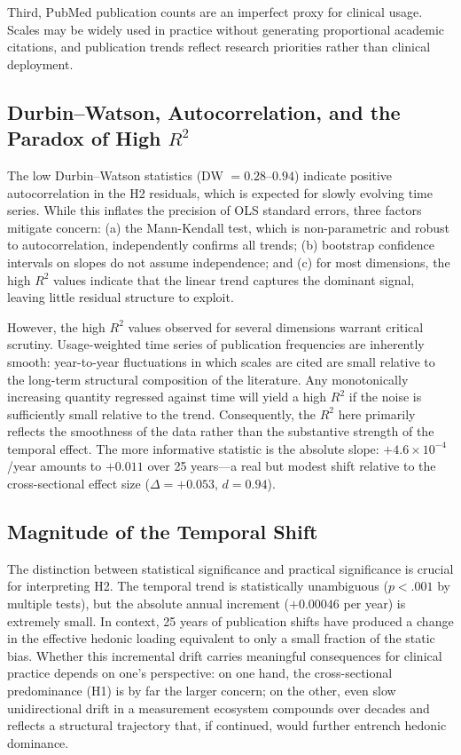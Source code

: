 \documentclass[12pt,a4paper]{article}
\begin{document}
Third, PubMed publication counts are an imperfect proxy for clinical usage.
Scales may be widely used in practice without generating proportional academic citations, and publication trends reflect research priorities rather than clinical deployment.

\subsection{Durbin--Watson, Autocorrelation, and the Paradox of High $R^2$}

The low Durbin--Watson statistics (DW $= 0.28$--$0.94$) indicate positive autocorrelation in the H2 residuals, which is expected for slowly evolving time series.
While this inflates the precision of OLS standard errors, three factors mitigate concern: (a) the Mann-Kendall test, which is non-parametric and robust to autocorrelation, independently confirms all trends; (b) bootstrap confidence intervals on slopes do not assume independence; and (c) for most dimensions, the high $R^2$ values indicate that the linear trend captures the dominant signal, leaving little residual structure to exploit.

However, the high $R^2$ values observed for several dimensions warrant critical scrutiny.
Usage-weighted time series of publication frequencies are inherently smooth: year-to-year fluctuations in which scales are cited are small relative to the long-term structural composition of the literature.
Any monotonically increasing quantity regressed against time will yield a high $R^2$ if the noise is sufficiently small relative to the trend.
Consequently, the $R^2$ here primarily reflects the smoothness of the data rather than the substantive strength of the temporal effect.
The more informative statistic is the absolute slope: $+4.6 \times 10^{-4}$/year amounts to $+0.011$ over 25 years---a real but modest shift relative to the cross-sectional effect size ($\Delta = +0.053$, $d = 0.94$).

\subsection{Magnitude of the Temporal Shift}

The distinction between statistical significance and practical significance is crucial for interpreting H2.
The temporal trend is statistically unambiguous ($p < .001$ by multiple tests), but the absolute annual increment ($+0.00046$ per year) is extremely small.
In context, 25 years of publication shifts have produced a change in the effective hedonic loading equivalent to only a small fraction of the static bias.
Whether this incremental drift carries meaningful consequences for clinical practice depends on one's perspective: on one hand, the cross-sectional predominance (H1) is by far the larger concern; on the other, even slow unidirectional drift in a measurement ecosystem compounds over decades and reflects a structural trajectory that, if continued, would further entrench hedonic dominance.
\end{document}
